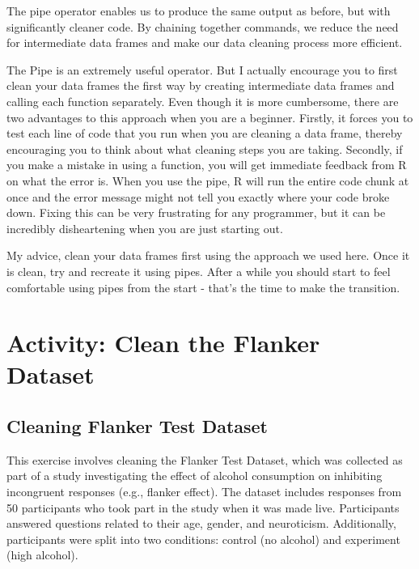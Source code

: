 \documentclass[
]{book}
\begin{document}
The pipe operator enables us to produce the same output as before, but with significantly cleaner code. By chaining together commands, we reduce the need for intermediate data frames and make our data cleaning process more efficient.

The Pipe is an extremely useful operator. But I actually encourage you to first clean your data frames the first way by creating intermediate data frames and calling each function separately. Even though it is more cumbersome, there are two advantages to this approach when you are a beginner. Firstly, it forces you to test each line of code that you run when you are cleaning a data frame, thereby encouraging you to think about what cleaning steps you are taking. Secondly, if you make a mistake in using a function, you will get immediate feedback from R on what the error is. When you use the pipe, R will run the entire code chunk at once and the error message might not tell you exactly where your code broke down. Fixing this can be very frustrating for any programmer, but it can be incredibly disheartening when you are just starting out.

My advice, clean your data frames first using the approach we used here. Once it is clean, try and recreate it using pipes. After a while you should start to feel comfortable using pipes from the start - that's the time to make the transition.

\hypertarget{clean-activity}{%
\section{Activity: Clean the Flanker Dataset}\label{clean-activity}}

\hypertarget{cleaning-flanker-test-dataset}{%
\subsection{\texorpdfstring{\textbf{Cleaning Flanker Test Dataset}}{Cleaning Flanker Test Dataset}}\label{cleaning-flanker-test-dataset}}

This exercise involves cleaning the Flanker Test Dataset, which was collected as part of a study investigating the effect of alcohol consumption on inhibiting incongruent responses (e.g., flanker effect). The dataset includes responses from 50 participants who took part in the study when it was made live. Participants answered questions related to their age, gender, and neuroticism. Additionally, participants were split into two conditions: control (no alcohol) and experiment (high alcohol).
\end{document}
